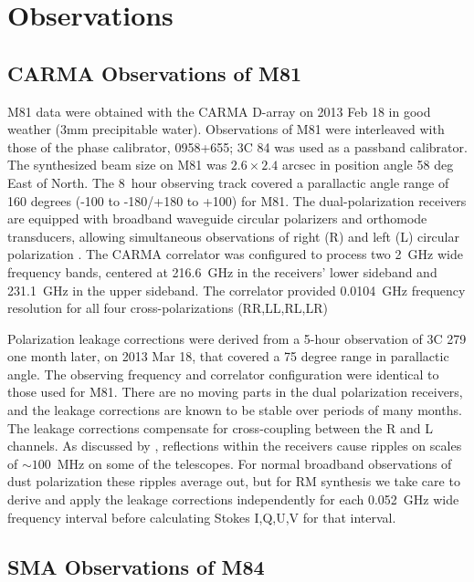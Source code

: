 \documentclass[12pt,preprint]{aastex}
\begin{document}
\section{Observations}

\subsection{CARMA Observations of M81}


M81 data were obtained with the CARMA D-array on 2013 Feb 18 in good weather
(3mm precipitable water).  Observations of M81 were interleaved with those of
the phase calibrator, 0958+655; 3C 84 was used as a passband calibrator.  
The synthesized beam size on M81 was $2.6 \times 2.4$ arcsec in position
angle 58 deg East of North.  The
8~hour observing track covered a parallactic angle range of 160 degrees (-100
to -180/+180 to +100) for M81.  The dual-polarization receivers are equipped
with broadband waveguide circular polarizers and orthomode transducers,
allowing simultaneous observations of right (R) and left (L) circular
polarization \citep{2015JAI.....450005H}.  The CARMA correlator was configured
to process two 2~GHz wide frequency bands, centered at 216.6~GHz in the
receivers' lower sideband and 231.1~GHz in the upper sideband.  The correlator
provided 0.0104~GHz frequency resolution for all four cross-polarizations
(RR,LL,RL,LR) 

Polarization leakage corrections were derived from a 5-hour observation of
3C 279 one month later, on 2013 Mar 18, that covered a 75 degree range in
parallactic angle.  The observing frequency and correlator configuration were
identical to those used for M81.  There are no moving parts in the dual
polarization receivers, and the leakage corrections are known to be stable over
periods of many months.  The leakage corrections compensate for cross-coupling
between the R and L channels.  As discussed by \citet{2015JAI.....450005H},
reflections within the receivers cause ripples on scales of $\sim 100$~MHz on
some of the telescopes.  For normal broadband observations of dust polarization
\citep[e.g.,][]{2014ApJS..213...13H} these ripples average out, but for RM
synthesis we take care to derive and apply the leakage corrections
independently for each 0.052~GHz wide frequency interval before calculating
Stokes I,Q,U,V for that interval.  



\subsection{SMA Observations of M84}
\end{document}
